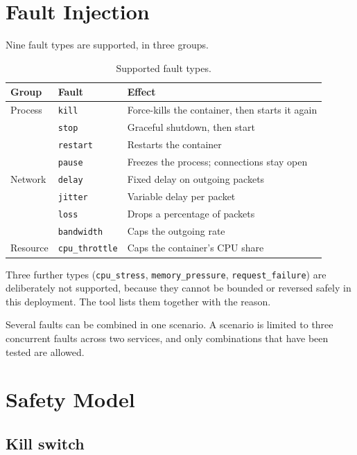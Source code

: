 \documentclass[11pt,a4paper]{article}
\begin{document}
\section{Fault Injection}

Nine fault types are supported, in three groups.

\begin{table}[h]
\centering
\begin{tabularx}{\textwidth}{@{}llL@{}}
\toprule
\textbf{Group} & \textbf{Fault} & \textbf{Effect} \\
\midrule
Process & \texttt{kill} & Force-kills the container, then starts it again \\
        & \texttt{stop} & Graceful shutdown, then start \\
        & \texttt{restart} & Restarts the container \\
        & \texttt{pause} & Freezes the process; connections stay open \\
Network & \texttt{delay} & Fixed delay on outgoing packets \\
        & \texttt{jitter} & Variable delay per packet \\
        & \texttt{loss} & Drops a percentage of packets \\
        & \texttt{bandwidth} & Caps the outgoing rate \\
Resource & \texttt{cpu\_throttle} & Caps the container's CPU share \\
\bottomrule
\end{tabularx}
\caption{Supported fault types.}
\end{table}

Three further types (\texttt{cpu\_stress}, \texttt{memory\_pressure},
\texttt{request\_failure}) are deliberately not supported, because they cannot
be bounded or reversed safely in this deployment. The tool lists them together
with the reason.

Several faults can be combined in one scenario. A scenario is limited to three
concurrent faults across two services, and only combinations that have been
tested are allowed.

\section{Safety Model}

\subsection{Kill switch}
\end{document}
